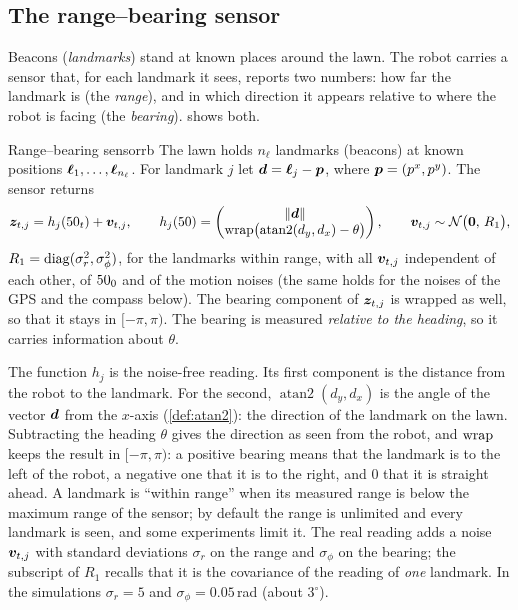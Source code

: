 \subsection{The range--bearing sensor}

Beacons (\emph{landmarks}) stand at known places around the lawn. The
robot carries a sensor that, for each landmark it sees, reports two
numbers: how far the landmark is (the \emph{range}), and in which
direction it appears relative to where the robot is facing (the
\emph{bearing}).  shows both.

\begin{definition}{Range--bearing sensor}{rb}
The lawn holds $n_\ell$ landmarks (beacons) at known positions
$\bm{\ell}_1,\dots,\bm{\ell}_{n_\ell}$. For landmark $j$ let $\bm{d}=\bm{\ell}_j-\bm{p}$, where
$\bm{p}=(p^x,p^y)$. The sensor returns
\begin{equation}\label{eq:h}
  \bm{z}_{t,j}=h_j(50_t)+\bm{v}_{t,j},\qquad
  h_j(50)=\begin{pmatrix}\left\lVert \bm{d}\right\rVert\\
  \operatorname{wrap}\bigl(\operatorname{atan2}(d_y,d_x)-\theta\bigr)\end{pmatrix},
  \qquad \bm{v}_{t,j}\sim\mathcal{N}\bigl(\bm{0},\,R_1\bigr),
\end{equation}
$R_1=\operatorname{diag}(\sigma_r^2,\sigma_\phi^2)$, for the landmarks within range,
with all $\bm{v}_{t,j}$ independent of each other, of $50_0$ and of the
motion noises (the same holds for the noises of the GPS and the compass
below). The bearing component of $\bm{z}_{t,j}$ is wrapped as well, so that it
stays in $[-\pi,\pi)$. The bearing is measured \emph{relative to
the heading}, so it carries information about $\theta$.
\end{definition}

The function $h_j$ is the noise-free reading. Its first component is the
distance from the robot to the landmark. For the second,
$\operatorname{atan2}(d_y,d_x)$ is the angle of the vector $\bm{d}$ from
the $x$-axis (\cref{def:atan2}): the direction of the landmark on the
lawn.
Subtracting the heading $\theta$ gives the direction as seen from the
robot, and $\operatorname{wrap}$ keeps the result in $[-\pi,\pi)$: a positive bearing
means that the landmark is to the left of the robot, a negative one that
it is to the right, and $0$ that it is straight ahead. A landmark is
``within range'' when its measured range is below the maximum range of
the sensor;
by default the range is unlimited and every landmark is seen, and some
experiments limit it. The real reading adds
a noise $\bm{v}_{t,j}$ with standard deviations $\sigma_r$ on the range and
$\sigma_\phi$ on the bearing; the subscript of $R_1$ recalls that it is the
covariance of the reading of \emph{one} landmark. In the simulations
$\sigma_r=5$ and $\sigma_\phi=0.05$\,rad (about $3^\circ$).

